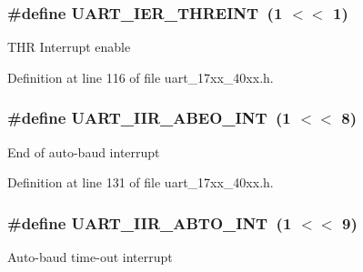 \subsubsection[{\texorpdfstring{U\+A\+R\+T\+\_\+\+I\+E\+R\+\_\+\+T\+H\+R\+E\+I\+NT}{UART_IER_THREINT}}]{\setlength{\rightskip}{0pt plus 5cm}\#define U\+A\+R\+T\+\_\+\+I\+E\+R\+\_\+\+T\+H\+R\+E\+I\+NT~(1 $<$$<$ 1)}\hypertarget{group__UART__17XX__40XX_gaa0d5f875782af503852f8b8f93292673}{}\label{group__UART__17XX__40XX_gaa0d5f875782af503852f8b8f93292673}
T\+HR Interrupt enable 

Definition at line 116 of file uart\+\_\+17xx\+\_\+40xx.\+h.

\subsubsection[{\texorpdfstring{U\+A\+R\+T\+\_\+\+I\+I\+R\+\_\+\+A\+B\+E\+O\+\_\+\+I\+NT}{UART_IIR_ABEO_INT}}]{\setlength{\rightskip}{0pt plus 5cm}\#define U\+A\+R\+T\+\_\+\+I\+I\+R\+\_\+\+A\+B\+E\+O\+\_\+\+I\+NT~(1 $<$$<$ 8)}\hypertarget{group__UART__17XX__40XX_ga6ce7f02b02e196d84ef8f6066dd2b9d4}{}\label{group__UART__17XX__40XX_ga6ce7f02b02e196d84ef8f6066dd2b9d4}
End of auto-\/baud interrupt 

Definition at line 131 of file uart\+\_\+17xx\+\_\+40xx.\+h.

\subsubsection[{\texorpdfstring{U\+A\+R\+T\+\_\+\+I\+I\+R\+\_\+\+A\+B\+T\+O\+\_\+\+I\+NT}{UART_IIR_ABTO_INT}}]{\setlength{\rightskip}{0pt plus 5cm}\#define U\+A\+R\+T\+\_\+\+I\+I\+R\+\_\+\+A\+B\+T\+O\+\_\+\+I\+NT~(1 $<$$<$ 9)}\hypertarget{group__UART__17XX__40XX_ga29486c78b0afdb4b3943defe36d5404c}{}\label{group__UART__17XX__40XX_ga29486c78b0afdb4b3943defe36d5404c}
Auto-\/baud time-\/out interrupt 

